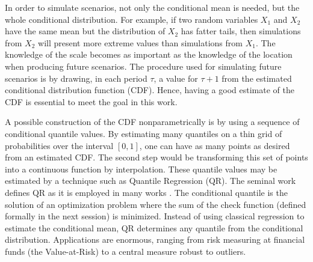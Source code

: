 In order to simulate scenarios, not only the conditional mean is needed, but the whole conditional distribution. For example, if two random variables $X_1$ and $X_2$ have the same mean but the distribution of $X_2$ has fatter tails, then simulations from $X_2$ will present more extreme values than simulations from $X_1$. The knowledge of the scale becomes as important as the knowledge of the location when producing future scenarios. The procedure used for simulating future scenarios is by drawing, in each period $\tau$, a value for $\tau+1$ from the estimated conditional distribution function (CDF). Hence, having a good estimate of the CDF is essential to meet the goal in this work. 

A possible construction of the CDF nonparametrically is by using a sequence of conditional quantile values. By estimating many quantiles on a thin grid of probabilities over the interval $[0,1]$, one can have as many points as desired from an estimated CDF. The second step would be transforming this set of points into a continuous function by interpolation. 
These quantile values may be estimated by a technique such as Quantile Regression (QR). 
The seminal work \cite{koenker1978regression} defines QR as it is employed in many works \cite{chao_quantile_2012,li_quantile_2007,bosch_convergent_nodate,gallego2016line,moller_time-adaptive_2008,nielsen2006,bremnes_probabilistic_2004,wan_direct_2017}. The conditional quantile is the solution of an optimization problem where the sum of the check function (defined formally in the next session) is minimized. Instead of using classical regression to estimate the conditional mean, QR determines any quantile from the conditional distribution. Applications are enormous, ranging from risk measuring at financial funds (the Value-at-Risk) to a central measure robust to outliers.







